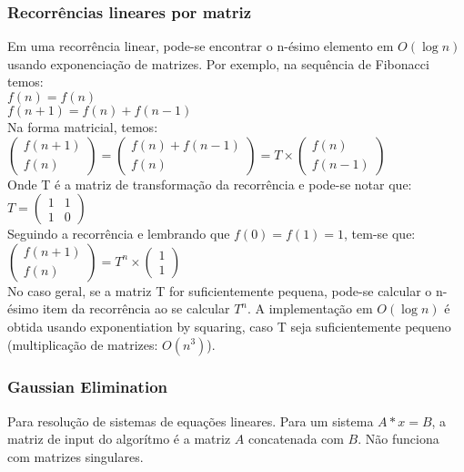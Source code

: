 \subsubsection{Recorrências lineares por matriz}
Em uma recorrência linear, pode-se encontrar o n-ésimo elemento em $O(\log{n})$ usando exponenciação de matrizes. Por exemplo, na sequência de Fibonacci temos:
\\ $f(n) = f(n)$
\\ $f(n+1) = f(n)+f(n-1)$
\\Na forma matricial, temos:
\\
$\left( \begin{array}{c}
f(n+1) \\
f(n) \end{array} \right)
 = 
\left( \begin{array}{c}
f(n) + f(n-1) \\
f(n) \end{array} \right)
 = T \times
\left( \begin{array}{c}
f(n) \\
f(n-1) \end{array} \right)$
\\ Onde T é a matriz de transformação da recorrência e pode-se notar que:
$T=\left( \begin{array}{cc}
1 & 1 \\
1 & 0 \end{array} \right)$
\\ Seguindo a recorrência e lembrando que $f(0) = f(1) = 1$, tem-se que:
\\$\left( \begin{array}{c}
f(n+1) \\
f(n) \end{array} \right) = T^n \times
\left( \begin{array}{c}
1 \\
1 \end{array} \right)$
\\ No caso geral, se a matriz T for suficientemente pequena, pode-se calcular o n-ésimo item da recorrência ao se calcular $T^n$. A implementação em $O(\log{n})$ é obtida usando exponentiation by squaring, caso T seja suficientemente pequeno (multiplica\c{c}\~{a}o de matrizes: $O(n^3)$).

\divisor
\subsubsection{Gaussian Elimination}
Para resolu\c{c}\~{a}o de sistemas de equa\c{c}\~{o}es lineares. Para um sistema $A*x = B$, a matriz de input do algor\'{i}tmo \'{e} a matriz $A$ concatenada com $B$.
N\~{a}o funciona com matrizes singulares.
\divisor

